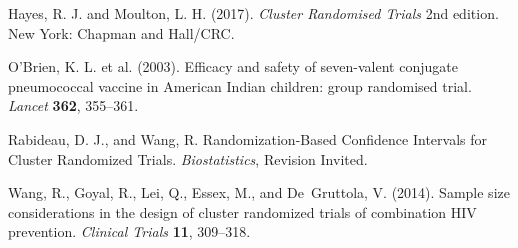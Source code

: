\documentclass[12pt]{article}\usepackage[]{graphicx}\usepackage[]{color}
\begin{document}
\noindent\hangindent=15pt Hayes, R. J. and Moulton, L. H. (2017). \textit{Cluster Randomised Trials} 2nd edition. New York: Chapman and Hall/CRC.

\noindent\hangindent=15pt O'Brien, K. L. et al. (2003). Efficacy and safety of seven-valent conjugate pneumococcal vaccine in American Indian children: group randomised trial. \textit{Lancet} \textbf{362}, 355--361.

\noindent\hangindent=15pt Rabideau, D. J., and Wang, R. Randomization-Based Confidence Intervals for Cluster Randomized Trials. \textit{Biostatistics}, Revision Invited.

\noindent\hangindent=15pt Wang, R., Goyal, R., Lei, Q., Essex, M., and De~Gruttola, V. (2014). Sample size considerations in the design of cluster randomized trials of combination HIV prevention. \textit{Clinical Trials} \textbf{11}, 309--318.
\end{document}
